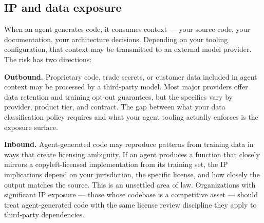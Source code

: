 \documentclass[
  a4paper,
  DIV=11,
  numbers=noendperiod]{scrreprt}
\begin{document}
\subsection{IP and data exposure}\label{ip-and-data-exposure}

When an agent generates code, it consumes context --- your source code,
your documentation, your architecture decisions. Depending on your
tooling configuration, that context may be transmitted to an external
model provider. The risk has two directions:

\textbf{Outbound.} Proprietary code, trade secrets, or customer data
included in agent context may be processed by a third-party model. Most
major providers offer data retention and training opt-out guarantees,
but the specifics vary by provider, product tier, and contract. The gap
between what your data classification policy requires and what your
agent tooling actually enforces is the exposure surface.

\textbf{Inbound.} Agent-generated code may reproduce patterns from
training data in ways that create licensing ambiguity. If an agent
produces a function that closely mirrors a copyleft-licensed
implementation from its training set, the IP implications depend on your
jurisdiction, the specific license, and how closely the output matches
the source. This is an unsettled area of law. Organizations with
significant IP exposure --- those whose codebase is a competitive asset
--- should treat agent-generated code with the same license review
discipline they apply to third-party dependencies.
\end{document}
